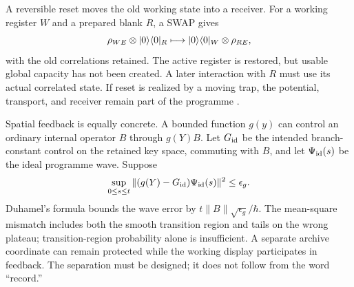 A reversible reset moves the old working state into a receiver. For a working register $W$ and a prepared blank $R$, a SWAP gives
\[
\rho_{WE}\otimes\lvert 0\rangle\langle 0\rvert_R
\longmapsto
\lvert 0\rangle\langle 0\rvert_W\otimes\rho_{RE},
\]
with the old correlations retained. The active register is restored, but usable global capacity has not been created. A later interaction with $R$ must use its actual correlated state. If reset is realized by a moving trap, the potential, transport, and receiver remain part of the programme \cite{RodgersMassive}.

Spatial feedback is equally concrete. A bounded function $g(y)$ can control an ordinary internal operator $B$ through $g(Y)B$. Let $G_{\rm id}$ be the intended branch-constant control on the retained key space, commuting with $B$, and let $\Psi_{\rm id}(s)$ be the ideal programme wave. Suppose
\[
 \sup_{0\le s\le t}
 \|(g(Y)-G_{\rm id})\Psi_{\rm id}(s)\|^2\le\epsilon_g.
\]
Duhamel's formula bounds the wave error by $t\|B\|\sqrt{\epsilon_g}/\hbar$. The mean-square mismatch includes both the smooth transition region and tails on the wrong plateau; transition-region probability alone is insufficient. A separate archive coordinate can remain protected while the working display participates in feedback. The separation must be designed; it does not follow from the word ``record.''

